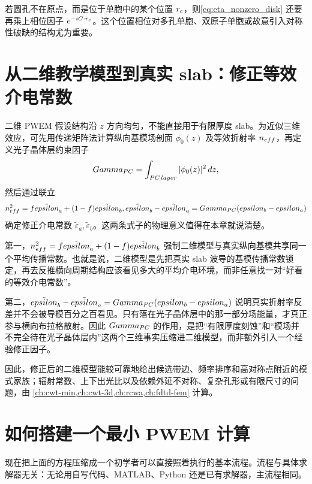 若圆孔不在原点，而是位于单胞中的某个位置 $r_c$，则\cref{eq:eta_nonzero_disk} 还要再乘上相位因子 $e^{-iG\cdot r_c}$。这个位置相位对多孔单胞、双原子单胞或故意引入对称性破缺的结构尤为重要。

\section{从二维教学模型到真实 slab：修正等效介电常数}
\label{sec:pwem-slab-correction}
二维 PWEM 假设结构沿 $z$ 方向均匀，不能直接用于有限厚度 slab。为近似三维效应，可先用传递矩阵法计算纵向基模场剖面 $\phi_0(z)$ 及等效折射率 $n_{\rm eff}$，再定义光子晶体层约束因子
\begin{equation}
\Gamma_{\rm PC} = \int_{\rm PC\,layer} |\phi_0(z)|^2\,dz,
\label{eq:gamma_pc}
\end{equation}
然后通过联立
\begin{equation}
n_{\rm eff}^2 = f\tilde{\varepsilon}_a + (1-f)\tilde{\varepsilon}_b,
\qquad
\tilde{\varepsilon}_b - \tilde{\varepsilon}_a = \Gamma_{\rm PC}(\varepsilon_b - \varepsilon_a)
\label{eq:modified_eps}
\end{equation}
确定修正介电常数 $\tilde{\varepsilon}_a,\tilde{\varepsilon}_b$。这两条式子的物理意义值得在本章就说清楚。

第一，$n_{\rm eff}^2 = f\tilde{\varepsilon}_a + (1-f)\tilde{\varepsilon}_b$ 强制二维模型与真实纵向基模共享同一个平均传播常数。也就是说，二维模型是先把真实 slab 波导的基模传播常数锁定，再去反推横向周期结构应该看见多大的平均介电环境，而非任意找一对“好看的等效介电常数”。

第二，$\tilde{\varepsilon}_b-\tilde{\varepsilon}_a = \Gamma_{\rm PC}(\varepsilon_b-\varepsilon_a)$ 说明真实折射率反差并不会被导模百分之百看见。只有落在光子晶体层中的那一部分场能量，才真正参与横向布拉格散射。因此 $\Gamma_{\rm PC}$ 的作用，是把“有限厚度刻蚀”和“模场并不完全待在光子晶体层内”这两个三维事实压缩进二维模型，而非额外引入一个经验修正因子。

因此，修正后的二维模型能较可靠地给出候选带边、频率排序和高对称点附近的模式家族；辐射常数、上下出光比以及依赖外延不对称、复杂孔形或有限尺寸的问题，由 \cref{ch:cwt-min,ch:cwt-3d,ch:rcwa,ch:fdtd-fem} 计算。


\section{如何搭建一个最小 PWEM 计算}
现在把上面的方程压缩成一个初学者可以直接照着执行的基本流程。流程与具体求解器无关：无论用自写代码、MATLAB、Python 还是已有求解器，主流程相同。

